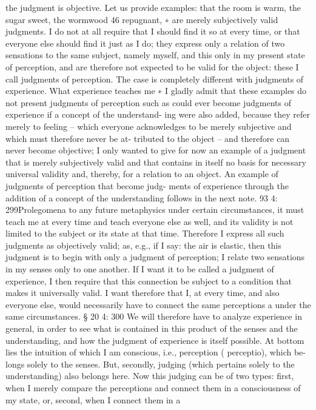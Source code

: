 the judgment is objective.
Let us provide examples: that the room is warm, the sugar sweet,
the wormwood 46 repugnant, ∗ are merely subjectively valid judgments.
I do not at all require that I should ﬁnd it so at every time, or that
everyone else should ﬁnd it just as I do; they express only a relation of
two sensations to the same subject, namely myself, and this only in my
present state of perception, and are therefore not expected to be valid for
the object: these I call judgments of perception. The case is completely
different with judgments of experience. What experience teaches me
∗
I gladly admit that these examples do not present judgments of perception such
as could ever become judgments of experience if a concept of the understand-
ing were also added, because they refer merely to feeling – which everyone
acknowledges to be merely subjective and which must therefore never be at-
tributed to the object – and therefore can never become objective; I only wanted
to give for now an example of a judgment that is merely subjectively valid and
that contains in itself no basis for necessary universal validity and, thereby, for a
relation to an object. An example of judgments of perception that become judg-
ments of experience through the addition of a concept of the understanding
follows in the next note.
93
4: 299Prolegomena to any future metaphysics
under certain circumstances, it must teach me at every time and teach
everyone else as well, and its validity is not limited to the subject or its
state at that time. Therefore I express all such judgments as objectively
valid; as, e.g., if I say: the air is elastic, then this judgment is to begin
with only a judgment of perception; I relate two sensations in my senses
only to one another. If I want it to be called a judgment of experience, I
then require that this connection be subject to a condition that makes it
universally valid. I want therefore that I, at every time, and also everyone
else, would necessarily have to connect the same perceptions a under the
same circumstances.
§ 20
4: 300
We will therefore have to analyze experience in general, in order to see
what is contained in this product of the senses and the understanding,
and how the judgment of experience is itself possible. At bottom lies the
intuition of which I am conscious, i.e., perception ( perceptio), which be-
longs solely to the senses. But, secondly, judging (which pertains solely
to the understanding) also belongs here. Now this judging can be of two
types: ﬁrst, when I merely compare the perceptions and connect them
in a consciousness of my state, or, second, when I connect them in a
